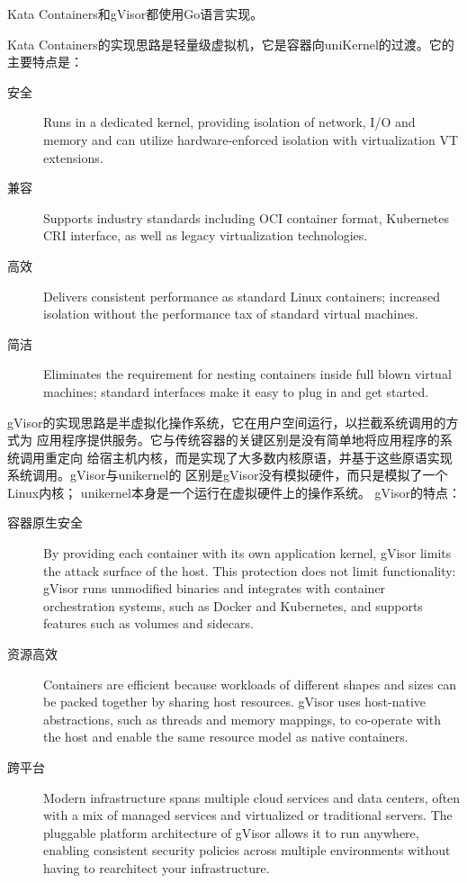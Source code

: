 \documentclass{../runikraft-report}
\begin{document}
Kata Containers和gVisor都使用Go语言实现。

Kata Containers的实现思路是轻量级虚拟机，它是容器向uniKernel的过渡。它的主要特点是\cite{bib:kata}：
\begin{description}
\item[安全] Runs in a dedicated kernel, providing isolation of network,
I/O and memory and can utilize hardware-enforced isolation with virtualization VT extensions.
\item[兼容] Supports industry standards including OCI container format,
Kubernetes CRI interface, as well as legacy virtualization technologies.
\item[高效] Delivers consistent performance as standard Linux containers;
increased isolation without the performance tax of standard virtual machines.
\item[简洁] Eliminates the requirement for nesting containers inside full
blown virtual machines; standard interfaces make it easy to plug in and get started.
\end{description}

gVisor的实现思路是半虚拟化操作系统，它在用户空间运行，以拦截系统调用的方式为
应用程序提供服务。它与传统容器的关键区别是没有简单地将应用程序的系统调用重定向
给宿主机内核，而是实现了大多数内核原语，并基于这些原语实现系统调用。gVisor与unikernel的
区别是gVisor没有模拟硬件，而只是模拟了一个Linux内核；
unikernel本身是一个运行在虚拟硬件上的操作系统。
gVisor的特点：\cite{bib:gvisor}
\begin{description}
\item[容器原生安全] By providing each container with its own application kernel, gVisor limits the attack surface of the host. This protection does not limit functionality: gVisor runs unmodified binaries and integrates with container orchestration systems, such as Docker and Kubernetes, and supports features such as volumes and sidecars.

\item[资源高效] Containers are efficient because workloads of different shapes and sizes can be packed together by sharing host resources. gVisor uses host-native abstractions, such as threads and memory mappings, to co-operate with the host and enable the same resource model as native containers.

\item[跨平台] Modern infrastructure spans multiple cloud services and data centers, often with a mix of managed services and virtualized or traditional servers. The pluggable platform architecture of gVisor allows it to run anywhere, enabling consistent security policies across multiple environments without having to rearchitect your infrastructure.
\end{description}
\end{document}
